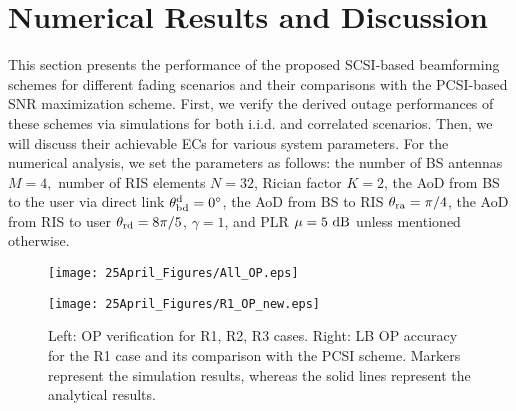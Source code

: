 \documentclass[journal,draftclsnofoot,onecolumn,12pt]{IEEEtran}
\begin{document}
\section{Numerical Results and Discussion}\vspace{-.1cm}
This section presents the performance of the proposed SCSI-based beamforming schemes for different fading scenarios and their comparisons with the PCSI-based SNR maximization scheme. 
First, we verify the derived outage performances of these schemes via simulations for both {\rm i.i.d.} and correlated scenarios. Then, we will discuss their achievable ECs for various system parameters. For the numerical analysis, we set the parameters as follows: the number of BS antennas $M = 4,$ number of RIS elements $N = 32$, Rician factor $K = 2$, the AoD from  BS to  the user via  direct link $\theta_{\rm{bd}}^{\rm{d}} = 0^\circ$, the AoD from  BS to  RIS $\theta_{\rm{ra}} = \pi/4$, the AoD from  RIS to  user $\theta_{\rm{rd}} = 8 \pi/5$, $\gamma = 1$, and PLR $\mu = 5~\rm{dB}$ unless mentioned otherwise. 
\begin{figure}[ht!]
\centering\vspace{-.5cm}
\begin{minipage}{.4\textwidth}
  \centering
  \texttt{[image: 25April\_Figures/All\_OP.eps]}
\end{minipage}%
\begin{minipage}{.4\textwidth}
  \centering
  \texttt{[image: 25April\_Figures/R1\_OP\_new.eps]} 
\end{minipage}\vspace{-.2cm}
\caption{Left: OP verification for R1, R2, R3 cases. Right: LB OP accuracy for the R1 case and its comparison with the PCSI scheme. Markers represent the simulation results, whereas the solid lines represent the analytical results.}\vspace{-.5cm}
\label{Fig1}
\end{figure}
\end{document}
